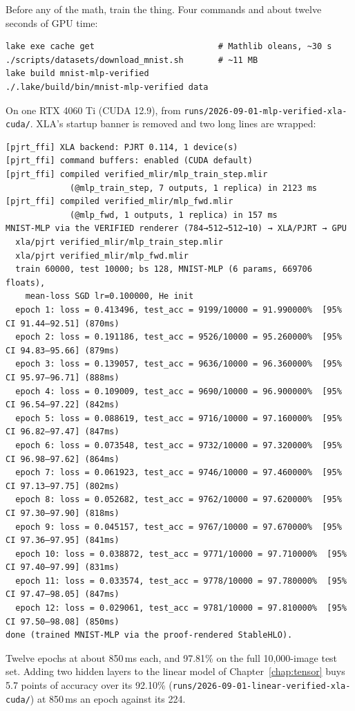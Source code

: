 Before any of the math, train the thing. Four commands and about twelve
seconds of GPU time:

\begin{verbatim}
lake exe cache get                         # Mathlib oleans, ~30 s
./scripts/datasets/download_mnist.sh       # ~11 MB
lake build mnist-mlp-verified
./.lake/build/bin/mnist-mlp-verified data
\end{verbatim}

On one RTX 4060 Ti (CUDA 12.9), from
\texttt{runs/2026-09-01-mlp-verified-xla-cuda/}. XLA's startup banner is
removed and two long lines are wrapped:

\begin{verbatim}
[pjrt_ffi] XLA backend: PJRT 0.114, 1 device(s)
[pjrt_ffi] command buffers: enabled (CUDA default)
[pjrt_ffi] compiled verified_mlir/mlp_train_step.mlir
             (@mlp_train_step, 7 outputs, 1 replica) in 2123 ms
[pjrt_ffi] compiled verified_mlir/mlp_fwd.mlir
             (@mlp_fwd, 1 outputs, 1 replica) in 157 ms
MNIST-MLP via the VERIFIED renderer (784→512→512→10) → XLA/PJRT → GPU
  xla/pjrt verified_mlir/mlp_train_step.mlir
  xla/pjrt verified_mlir/mlp_fwd.mlir
  train 60000, test 10000; bs 128, MNIST-MLP (6 params, 669706 floats),
    mean-loss SGD lr=0.100000, He init
  epoch 1: loss = 0.413496, test_acc = 9199/10000 = 91.990000%  [95% CI 91.44–92.51] (870ms)
  epoch 2: loss = 0.191186, test_acc = 9526/10000 = 95.260000%  [95% CI 94.83–95.66] (879ms)
  epoch 3: loss = 0.139057, test_acc = 9636/10000 = 96.360000%  [95% CI 95.97–96.71] (888ms)
  epoch 4: loss = 0.109009, test_acc = 9690/10000 = 96.900000%  [95% CI 96.54–97.22] (842ms)
  epoch 5: loss = 0.088619, test_acc = 9716/10000 = 97.160000%  [95% CI 96.82–97.47] (847ms)
  epoch 6: loss = 0.073548, test_acc = 9732/10000 = 97.320000%  [95% CI 96.98–97.62] (864ms)
  epoch 7: loss = 0.061923, test_acc = 9746/10000 = 97.460000%  [95% CI 97.13–97.75] (802ms)
  epoch 8: loss = 0.052682, test_acc = 9762/10000 = 97.620000%  [95% CI 97.30–97.90] (818ms)
  epoch 9: loss = 0.045157, test_acc = 9767/10000 = 97.670000%  [95% CI 97.36–97.95] (841ms)
  epoch 10: loss = 0.038872, test_acc = 9771/10000 = 97.710000%  [95% CI 97.40–97.99] (831ms)
  epoch 11: loss = 0.033574, test_acc = 9778/10000 = 97.780000%  [95% CI 97.47–98.05] (847ms)
  epoch 12: loss = 0.029061, test_acc = 9781/10000 = 97.810000%  [95% CI 97.50–98.08] (850ms)
done (trained MNIST-MLP via the proof-rendered StableHLO).
\end{verbatim}

Twelve epochs at about 850\,ms each, and 97.81\% on the full
10,000-image test set. Adding two hidden layers to the linear model of
Chapter~\ref{chap:tensor} buys 5.7 points of accuracy over its 92.10\%
(\texttt{runs/2026-09-01-linear-verified-xla-cuda/}) at 850\,ms an epoch
against its 224.


